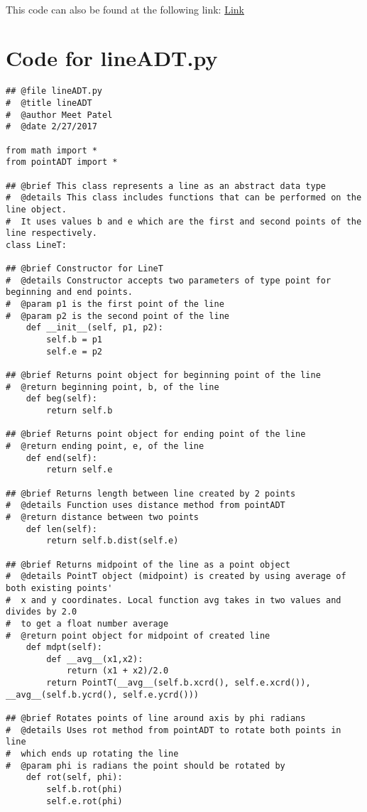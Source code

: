 \documentclass[12pt]{article}
\begin{document}
~\newline

\noindent This code can also be found at the following link:
\href{https://gitlab.cas.mcmaster.ca/se2aa4_cs2me3_assignments/patelm16/blob/master/A2/src/pointADT.py}{Link}

\newpage
\section{Code for lineADT.py} \label{MyLineSect}
\begin{lstlisting}
## @file lineADT.py
#  @title lineADT
#  @author Meet Patel
#  @date 2/27/2017

from math import *
from pointADT import *

## @brief This class represents a line as an abstract data type
#  @details This class includes functions that can be performed on the line object.
#  It uses values b and e which are the first and second points of the line respectively.
class LineT:
    
## @brief Constructor for LineT
#  @details Constructor accepts two parameters of type point for beginning and end points.
#  @param p1 is the first point of the line
#  @param p2 is the second point of the line
    def __init__(self, p1, p2):
        self.b = p1
        self.e = p2
        
## @brief Returns point object for beginning point of the line
#  @return beginning point, b, of the line
    def beg(self):
        return self.b

## @brief Returns point object for ending point of the line
#  @return ending point, e, of the line
    def end(self):
        return self.e
    
## @brief Returns length between line created by 2 points
#  @details Function uses distance method from pointADT
#  @return distance between two points
    def len(self):
        return self.b.dist(self.e)
    
## @brief Returns midpoint of the line as a point object
#  @details PointT object (midpoint) is created by using average of both existing points'
#  x and y coordinates. Local function avg takes in two values and divides by 2.0
#  to get a float number average
#  @return point object for midpoint of created line
    def mdpt(self):
        def __avg__(x1,x2):
            return (x1 + x2)/2.0
        return PointT(__avg__(self.b.xcrd(), self.e.xcrd()), __avg__(self.b.ycrd(), self.e.ycrd()))

## @brief Rotates points of line around axis by phi radians
#  @details Uses rot method from pointADT to rotate both points in line
#  which ends up rotating the line
#  @param phi is radians the point should be rotated by
    def rot(self, phi):
        self.b.rot(phi)
        self.e.rot(phi)

\end{lstlisting}
\end{document}
